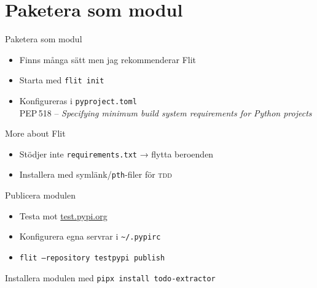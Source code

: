 \section{Paketera som modul}

\begin{frame}{Paketera som modul}
  \begin{itemize}
    \item Finns många sätt men jag rekommenderar Flit
    \item Starta med \texttt{flit init}
    \item Konfigureras i \texttt{pyproject.toml}\\
      PEP\,518 -- {\small\textit{Specifying minimum build system requirements for Python projects}}
  \end{itemize}
\end{frame}

\begin{frame}{More about Flit}
  \begin{itemize}
    \item Stödjer inte \texttt{requirements.txt} → flytta beroenden
    \item Installera med symlänk/\texttt{pth}-filer för \textsc{tdd}
  \end{itemize}
\end{frame}

\begin{frame}[fragile]{Publicera modulen}
  \begin{itemize}
    \item Testa mot \url{test.pypi.org}
    \item Konfigurera egna servrar i \texttt{\textasciitilde/.pypirc}
    \item \texttt{flit --repository testpypi publish}
  \end{itemize}

  \vfill

  Installera modulen med \texttt{pipx install todo-extractor}

\end{frame}
